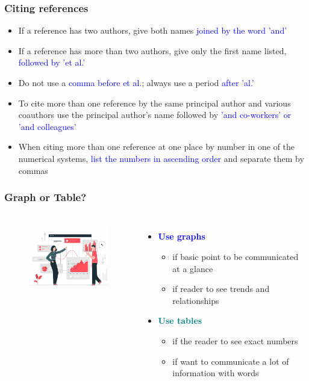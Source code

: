 \documentclass[newPxFont,sthlmFooter]{beamer}
\newcommand{\fs}{\footnotesize}
\begin{document}
\begin{frame}\frametitle{Citing references}
  \begin{itemize}
  \fs
  \item If a reference has two authors, give both names \textcolor{blue}{joined by the word 'and'}
  \item If a reference has more than two authors, give only the first name listed, \textcolor{blue}{followed by 'et al.'}
  \item Do not use a \textcolor{blue}{comma before et al.}; always use a period \textcolor{blue}{after 'al.'}
  \item To cite more than one reference by the same principal author and various coauthors use the principal author’s name followed by \textcolor{blue}{'and co-workers' or 'and colleagues'}
  \item When citing more than one reference at one place by number in one of the numerical systems, \textcolor{blue}{list the numbers in ascending order} and separate them by commas
  \end{itemize}
\end{frame}

\begin{frame}\frametitle{Graph or Table?}
  \begin{columns}[T,onlytextwidth]
  \begin{figure}
    \centering
    \includegraphics[width=2in]{figs/grap} 
  \end{figure}
  \begin{itemize}
  \fs
  \item \textcolor{blue}{\bf Use graphs}
	  \begin{itemize}
	    \fs
	  \item if basic point to be communicated at a glance
	  \item if reader to see trends and relationships
	  \end{itemize}
  \item \textcolor{teal}{\bf Use tables}
	    \begin{itemize}
	      \fs
	  \item if the reader to see exact numbers
	  \item if want to communicate a lot of information with words
	    \end{itemize}
  \end{itemize}
  \vspace{-2cm}
  \end{columns}
\end{frame}
\end{document}
